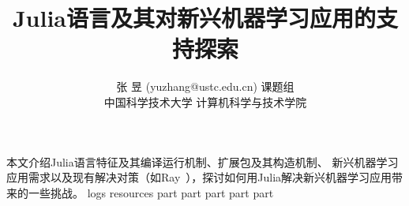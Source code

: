\documentclass[a4paper]{article}
\begin{document}
\title{Julia语言及其对新兴机器学习应用的支持探索}
\author{
\rm 张 昱 (yuzhang@ustc.edu.cn) 课题组\\
中国科学技术大学 计算机科学与技术学院
}

\maketitle
\newpage
本文介绍Julia语言特征及其编译运行机制、扩展包及其构造机制、
新兴机器学习应用需求以及现有解决对策（如Ray~\cite{moritz2018ray}），探讨如何用Julia解决新兴机器学习应用带来的一些挑战。
{logs}
\newpage
{resources}
{part}
{part}
{part}
{part}
{part}
\newpage
\begin{small}


\end{small}
\end{document}
